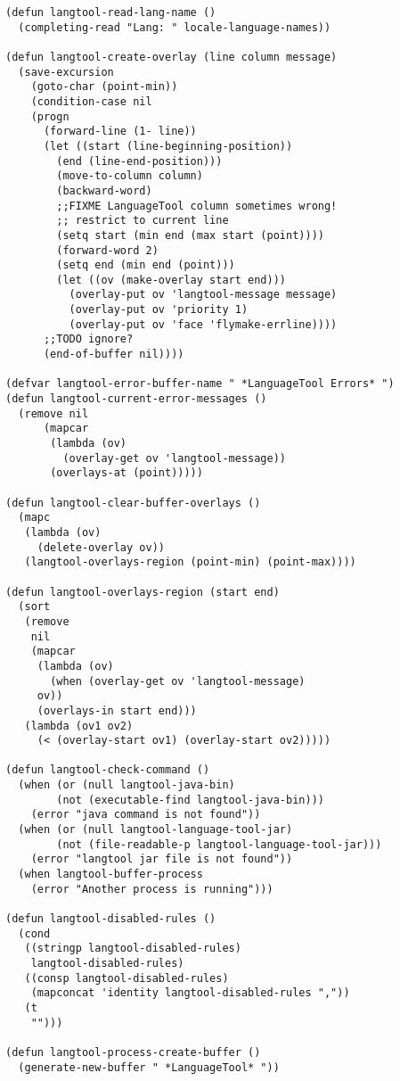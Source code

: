 \documentclass[11pt]{article}
\begin{document}
\begin{verbatim}
(defun langtool-read-lang-name ()
  (completing-read "Lang: " locale-language-names))

(defun langtool-create-overlay (line column message)
  (save-excursion
    (goto-char (point-min))
    (condition-case nil
	(progn
	  (forward-line (1- line))
	  (let ((start (line-beginning-position))
		(end (line-end-position)))
	    (move-to-column column)
	    (backward-word)
	    ;;FIXME LanguageTool column sometimes wrong!
	    ;; restrict to current line
	    (setq start (min end (max start (point))))
	    (forward-word 2)
	    (setq end (min end (point)))
	    (let ((ov (make-overlay start end)))
	      (overlay-put ov 'langtool-message message)
	      (overlay-put ov 'priority 1)
	      (overlay-put ov 'face 'flymake-errline))))
      ;;TODO ignore?
      (end-of-buffer nil))))

(defvar langtool-error-buffer-name " *LanguageTool Errors* ")
(defun langtool-current-error-messages ()
  (remove nil
	  (mapcar
	   (lambda (ov)
	     (overlay-get ov 'langtool-message))
	   (overlays-at (point)))))

(defun langtool-clear-buffer-overlays ()
  (mapc
   (lambda (ov)
     (delete-overlay ov))
   (langtool-overlays-region (point-min) (point-max))))

(defun langtool-overlays-region (start end)
  (sort
   (remove
    nil
    (mapcar
     (lambda (ov)
       (when (overlay-get ov 'langtool-message)
	 ov))
     (overlays-in start end)))
   (lambda (ov1 ov2)
     (< (overlay-start ov1) (overlay-start ov2)))))

(defun langtool-check-command ()
  (when (or (null langtool-java-bin)
	    (not (executable-find langtool-java-bin)))
    (error "java command is not found"))
  (when (or (null langtool-language-tool-jar)
	    (not (file-readable-p langtool-language-tool-jar)))
    (error "langtool jar file is not found"))
  (when langtool-buffer-process
    (error "Another process is running")))

(defun langtool-disabled-rules ()
  (cond
   ((stringp langtool-disabled-rules)
    langtool-disabled-rules)
   ((consp langtool-disabled-rules)
    (mapconcat 'identity langtool-disabled-rules ","))
   (t
    "")))

(defun langtool-process-create-buffer ()
  (generate-new-buffer " *LanguageTool* "))


\end{verbatim}
\end{document}
